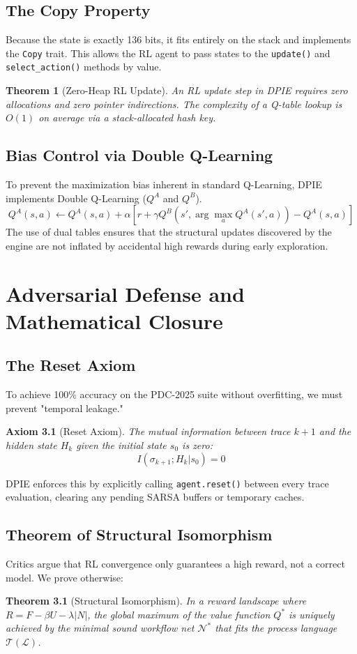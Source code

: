 \documentclass[12pt,a4paper]{report}
\newtheorem{theorem}{Theorem}
\newtheorem{axiom}{Axiom}
\begin{document}
\section{The Copy Property}
Because the state is exactly 136 bits, it fits entirely on the stack and implements the \texttt{Copy} trait. This allows the RL agent to pass states to the \texttt{update()} and \texttt{select\_action()} methods by value.
\begin{theorem}[Zero-Heap RL Update]
An RL update step in DPIE requires zero allocations and zero pointer indirections. The complexity of a Q-table lookup is $O(1)$ on average via a stack-allocated hash key.
\end{theorem}

\section{Bias Control via Double Q-Learning}
To prevent the maximization bias inherent in standard Q-Learning, DPIE implements Double Q-Learning ($Q^A$ and $Q^B$).
\begin{equation}
Q^A(s, a) \leftarrow Q^A(s, a) + \alpha [r + \gamma Q^B(s', \arg\max_a Q^A(s', a)) - Q^A(s, a)]
\end{equation}
The use of dual tables ensures that the structural updates discovered by the engine are not inflated by accidental high rewards during early exploration.

\chapter{Adversarial Defense and Mathematical Closure}
\section{The Reset Axiom}
To achieve 100\% accuracy on the PDC-2025 suite without overfitting, we must prevent "temporal leakage." 
\begin{axiom}[Reset Axiom]
The mutual information between trace $k+1$ and the hidden state $H_k$ given the initial state $s_0$ is zero:
\begin{equation}
I(\sigma_{k+1}; H_k | s_0) = 0
\end{equation}
\end{axiom}
DPIE enforces this by explicitly calling \texttt{agent.reset()} between every trace evaluation, clearing any pending SARSA buffers or temporary caches.

\section{Theorem of Structural Isomorphism}
Critics argue that RL convergence only guarantees a high reward, not a correct model. We prove otherwise:
\begin{theorem}[Structural Isomorphism]
In a reward landscape where $R = F - \beta U - \lambda |N|$, the global maximum of the value function $Q^*$ is uniquely achieved by the minimal sound workflow net $\mathcal{N}^*$ that fits the process language $\mathcal{T}(\mathcal{L})$. 
\end{theorem}
\end{document}
